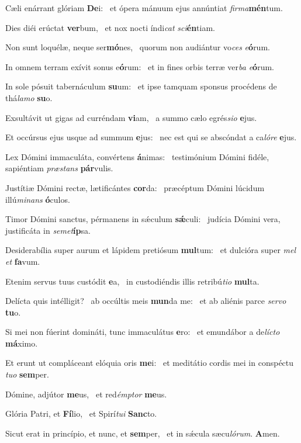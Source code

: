\item Cæli enárrant glóriam \textbf{De}i:~\psstar{} et ópera mánuum ejus annúntiat \textit{firma}\textbf{mén}tum.
\item Dies diéi erúctat \textbf{ver}bum,~\psstar{} et nox nocti índi\textit{cat} \textit{sci}\textbf{én}tiam.
\item Non sunt loquélæ, neque ser\textbf{mó}nes,~\psstar{} quorum non audiántur vo\textit{ces} \textit{e}\textbf{ó}rum.
\item In omnem terram exívit sonus e\textbf{ó}rum:~\psstar{} et in fines orbis terræ ver\textit{ba} \textit{e}\textbf{ó}rum.
\item In sole pósuit tabernáculum \textbf{su}um:~\psstar{} et ipse tamquam sponsus procédens de thá\textit{lamo} \textbf{su}o.
\item Exsultávit ut gigas ad curréndam \textbf{vi}am,~\psstar{} a summo cælo egrés\textit{sio} \textbf{e}jus.
\item Et occúrsus ejus usque ad summum \textbf{e}jus:~\psstar{} nec est qui se abscóndat a ca\textit{lóre} \textbf{e}jus.
\item Lex Dómini immaculáta, convértens \textbf{á}nimas:~\psstar{} testimónium Dómini fidéle, sapiéntiam \textit{præstans} \textbf{pár}vulis.
\item Justítiæ Dómini rectæ, lætificántes \textbf{cor}da:~\psstar{} præcéptum Dómini lúcidum illú\textit{minans} \textbf{ó}culos.
\item Timor Dómini sanctus, pérmanens in sǽculum \textbf{sǽ}culi:~\psstar{} judícia Dómini vera, justificáta in \textit{semet}\textbf{íp}sa.
\item Desiderabília super aurum et lápidem pretiósum \textbf{mul}tum:~\psstar{} et dulcióra super \textit{mel} \textit{et} \textbf{fa}vum.
\item Etenim servus tuus custódit \textbf{e}a,~\psstar{} in custodiéndis illis retribú\textit{tio} \textbf{mul}ta.
\item Delícta quis intélligit?~\pscross{} ab occúltis meis \textbf{mun}da me:~\psstar{} et ab aliénis parce \textit{servo} \textbf{tu}o.
\item Si mei non fúerint domináti, tunc immaculátus \textbf{e}ro:~\psstar{} et emundábor a de\textit{lícto} \textbf{má}ximo.
\item Et erunt ut compláceant elóquia oris \textbf{me}i:~\psstar{} et meditátio cordis mei in conspéctu \textit{tuo} \textbf{sem}per.
\item Dómine, adjútor \textbf{me}us,~\psstar{} et red\textit{émptor} \textbf{me}us.
\item Glória Patri, et \textbf{Fí}lio,~\psstar{} et Spirí\textit{tui} \textbf{Sanc}to.
\item Sicut erat in princípio, et nunc, et \textbf{sem}per,~\psstar{} et in sǽcula sæcu\textit{lórum}. \textbf{A}men.
